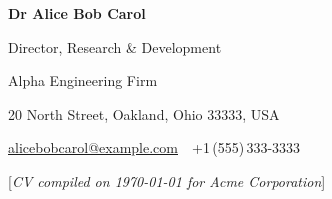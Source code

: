 \documentclass[a4paper,10pt,oneside]{article}
\newcommand{\CVNote}{CV compiled on {\today} for Acme Corporation}
\begin{document}
\begin{body}
\EntryGap
\textbf{Dr Alice Bob Carol}
\par
Director, Research \& Development
\begin{detail}
Alpha Engineering Firm
\par
20 North Street, Oakland, Ohio 33333, USA
\par
\href{mailto:alicebobcarol@example.com}
{alicebobcarol@example.com}
\,\BulletSymbol\,
+1\,(555)\,333-3333
\end{detail}


\end{body}


\begin{flushright}
\scriptsize%
[\textit{\CVNote}]%
\hspace{2.0mm}\null
\end{flushright}

\label{LastPage}~
\end{document}
